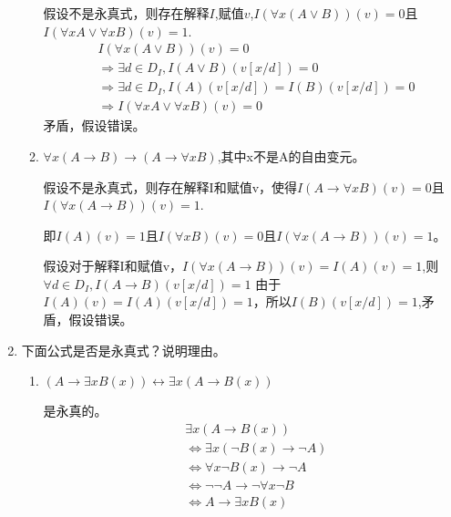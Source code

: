 \documentclass[UTF8]{ctexart}
\begin{document}
\begin{enumerate}
\begin{enumerate}
            假设不是永真式，则存在解释$I$,赋值$v$,$I(\forall x(A\vee B))(v)=0$且$I(\forall xA\vee \forall xB)(v)=1$.
            \[
                \begin{aligned}
                    &I(\forall x(A\vee B))(v)=0\\
                    &\Rightarrow \exists d\in D_I,I(A\vee B)(v[x/d])=0\\
                    &\Rightarrow \exists d\in D_I,I(A)(v[x/d])=I(B)(v[x/d])=0\\
                    &\Rightarrow I(\forall xA\vee \forall xB)(v)=0
                \end{aligned}
            \]
            矛盾，假设错误。
            
            \item $\forall x(A\rightarrow B)\rightarrow (A\rightarrow \forall xB)$,其中x不是A的自由变元。
            
            假设不是永真式，则存在解释I和赋值v，使得$I(A\rightarrow \forall xB)(v)=0$且$I(\forall x(A\rightarrow B))(v)=1$.
            
            即$I(A)(v)=1$且$I(\forall xB)(v)=0$且$I(\forall x(A\rightarrow B))(v)=1$。
            
            假设对于解释I和赋值v，$I(\forall x(A\rightarrow B))(v)=I(A)(v)=1$,则$\forall d\in D_I,I(A\rightarrow B)(v[x/d])=1$
            由于$I(A)(v)=I(A)(v[x/d])=1$，所以$I(B)(v[x/d])=1$,矛盾，假设错误。
            
        \end{enumerate}
        
        \item 下面公式是否是永真式？说明理由。
        \begin{enumerate}
            \item $(A\rightarrow \exists xB(x))\leftrightarrow \exists x(A\rightarrow B(x))$
            
            是永真的。
            \[
                \begin{aligned}
                    &\exists x(A\rightarrow B(x))\\
                    &\Leftrightarrow \exists x(\neg B(x)\rightarrow \neg A)\\
                    &\Leftrightarrow \forall x\neg B(x)\rightarrow \neg A\\
                    &\Leftrightarrow \neg \neg A\rightarrow \neg \forall x \neg B\\
                    &\Leftrightarrow A\rightarrow \exists xB(x)\\
                \end{aligned}
            \]
            

\end{enumerate}
\end{enumerate}
\end{document}
